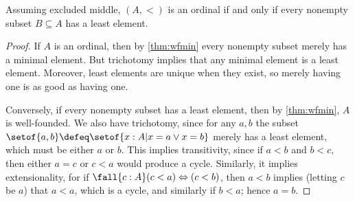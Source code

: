 %
\begin{thm}\label{thm:wellorder}
  Assuming excluded middle, $(A,<)$ is an ordinal if and only if every nonempty subset $B\subseteq A$ has a least element.
\end{thm}

\begin{proof}
  If $A$ is an ordinal, then by \cref{thm:wfmin} every nonempty subset merely has a minimal element.
  But trichotomy implies that any minimal element is a least element.
  Moreover, least elements are unique when they exist, so merely having one is as good as having one.

  Conversely, if every nonempty subset has a least element, then by \cref{thm:wfmin}, $A$ is well-founded.
  We also have trichotomy, since for any $a,b$ the subset
  $ \setof{a,b} \defeq \setof{x:A | x=a \lor x=b} $
  merely has a least element, which must be either $a$ or $b$.
  This implies transitivity, since if $a<b$ and $b<c$, then either $a=c$ or $c<a$ would produce a cycle.
  Similarly, it implies extensionality, for if $\fall{c:A}(c<a)\Leftrightarrow (c<b)$, then $a<b$ implies (letting $c$ be $a$) that $a<a$, which is a cycle, and similarly if $b<a$; hence $a=b$.
\end{proof}

